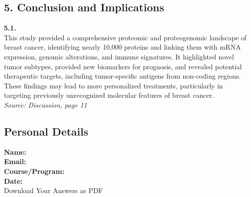 \documentclass[
  letterpaper,
  DIV=11,
  numbers=noendperiod]{scrartcl}
\begin{document}
\subsection{5. Conclusion and
Implications}\label{conclusion-and-implications-1}

\textbf{5.1.}\\
This study provided a comprehensive proteomic and proteogenomic
landscape of breast cancer, identifying nearly 10,000 proteins and
linking them with mRNA expression, genomic alterations, and immune
signatures. It highlighted novel tumor subtypes, provided new biomarkers
for prognosis, and revealed potential therapeutic targets, including
tumor-specific antigens from non-coding regions. These findings may lead
to more personalized treatments, particularly in targeting previously
unrecognized molecular features of breast cancer.\\
\emph{Source: Discussion, page 11}

\subsection{Personal Details}\label{personal-details}

\textbf{Name:}\\

\textbf{Email:}\\

\textbf{Course/Program:}\\

\textbf{Date:}\\

Download Your Answers as PDF
\end{document}
